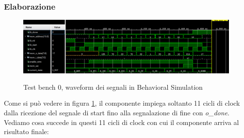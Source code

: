 \documentclass{article}
\begin{document}
\subsubsection{Elaborazione}
\begin{figure}[H]
    \centering
    \caption{Test bench 0, waveform dei segnali in Behavioral Simulation}
    \includegraphics[width=1.0\textwidth]{images/test-bench-0.png}
    \label{fig:test-bench-0}
\end{figure}
Come si può vedere in figura \ref{fig:test-bench-0}, il componente impiega soltanto 11 cicli di clock dalla ricezione del segnale di start fino alla segnalazione di fine con \textit{o\_done}.\\
Vediamo cosa succede in questi 11 cicli di clock con cui il componente arriva al risultato finale:
\renewcommand{\labelenumi}{\Roman{enumi}}
\end{document}
